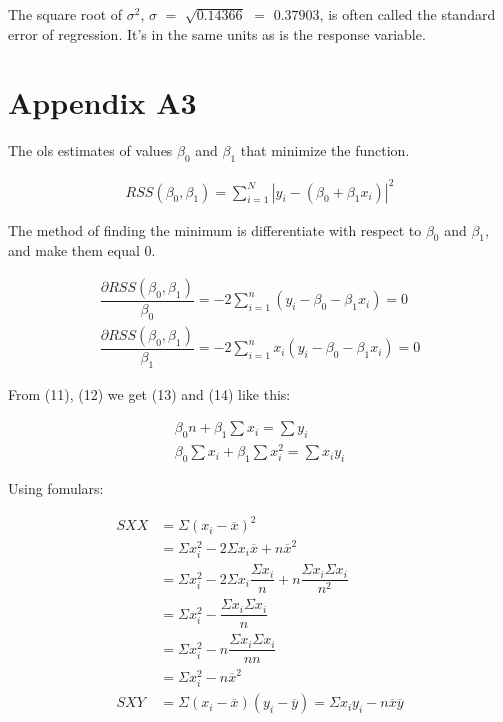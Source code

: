 \documentclass{article}
\begin{document}
    The square root of $\sigma ^ 2$, $\sigma$ $=$ $\sqrt{0.14366}$ $=$ $0.37903$, is often called the standard error of regression. It's in the same units as is the response variable.
    
\section{Appendix A3} 
    The ols estimates of values ${\beta_{0}}$ and ${\beta_{1}}$ that minimize the function.
    
    \begin{align}
        RSS(\beta_{0}, \beta_{1}) = \displaystyle \sum _{i = 1} ^ {N}   |y_{i} - (\beta_{0} + \beta_{1} x_{i})| ^ 2
    \end{align}
    
    The method of finding the minimum is differentiate with respect to $\beta_{0}$ and $\beta_{1}$, and make them equal $0$. 
     
    \begin{align} 
        \dfrac{\partial RSS(\beta_{0}, \beta_{1}) }{\beta_{0}} = -2 \displaystyle \sum _{i=1}^{n}  (y_{i} - \beta_{0} - \beta_{1} x_{i}) = 0
        \\
        \dfrac{\partial RSS(\beta_{0}, \beta_{1}) }{\beta_{1}} = -2 \displaystyle \sum _{i=1}^{n}  x_{i} (y_{i} - \beta_{0} - \beta_{1} x_{i}) = 0
    \end{align}
        
    From (11), (12) we get (13) and (14) like this: 
    
    \begin{align} 
        \beta_{0} n + \beta_{1} \displaystyle \sum x_{i} = \displaystyle \sum y_{i}
        \\
        \beta_{0} \displaystyle \sum x_{i} + \beta_{1} \displaystyle \sum x_{i}^2 = \displaystyle \sum x_{i} y_{i}
    \end{align}
    
    Using fomulars: 
    
     \begin{align} 
        SXX &= \Sigma (x_{i} - \overline{x})^2 \\
        &= \Sigma x_{i}^2 - 2 \Sigma x_{i} \overline{x} + n\overline{x}^2  \nonumber \\
        &= \Sigma x_{i}^2 - 2 \Sigma x_{i} \dfrac{\Sigma x_{i}}{n} + n\dfrac{\Sigma x_{i} \Sigma x_{i}}{n^2}   \nonumber \\
        &= \Sigma x_{i}^2 - \dfrac{\Sigma x_{i} \Sigma x_{i}}{n} \nonumber \\
        &= \Sigma x_{i}^2 - n\dfrac{\Sigma x_{i} \Sigma x_{i}}{n n} \nonumber \\
        &= \Sigma x_{i}^2 - n\overline{x}^2 \nonumber \\
        SXY &= \Sigma (x_{i} - \overline{x})(y_{i} - \overline{y}) = \Sigma x_{i}y_{i} - n\overline{x}\overline{y}
    \end{align}
    
\end{document}
